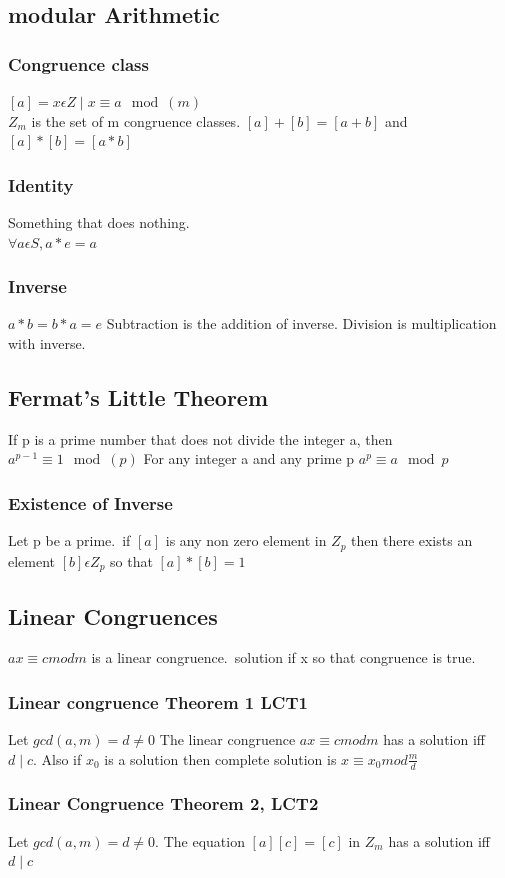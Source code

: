 \documentclass[12pt]{article}
\begin{document}
\subsection{modular Arithmetic}
\subsubsection{Congruence class}
$[a]={x\epsilon Z\mid x\equiv a \mod(m)}$
\\
$Z_m$ is the set of m congruence classes. $[a]+[b]=[a+b]$ and $[a]*[b]=[a*b]$
\subsubsection{Identity}
Something that does nothing. \\ $\forall a \epsilon S, a * e=a$
\subsubsection{Inverse}
$a*b=b*a=e$
Subtraction is the addition of inverse.
Division is multiplication with inverse.
\subsection{Fermat's Little Theorem}
If p is a prime number that does not divide the integer a, then $a^{p-1}
\equiv 1 \mod(p)$
For any integer a and any prime p $a^p\equiv a \mod p$
\subsubsection{Existence of Inverse}
Let p be a prime.\ if $[a]$ is any non zero element in $Z_p$ then there exists an
element $[b]\epsilon Z_p$ so that $[a]*[b]=1$
\subsection{Linear Congruences}
$ax\equiv c mod m$ is a linear congruence.\ solution if x so that congruence is
true.
\subsubsection{Linear congruence Theorem 1 LCT1}
Let $gcd(a,m)=d\neq 0$ The linear congruence $ax\equiv c mod m$ has a solution
iff $d\mid c$. Also if $x_0$ is a solution then complete solution is $x\equiv x_0
mod \frac{m}{d}$
\subsubsection{Linear Congruence Theorem 2, LCT2}
Let $gcd(a,m)=d\neq 0$. The equation $[a][c]=[c]$ in $Z_m$ has a solution iff
$d\mid c$
\end{document}
